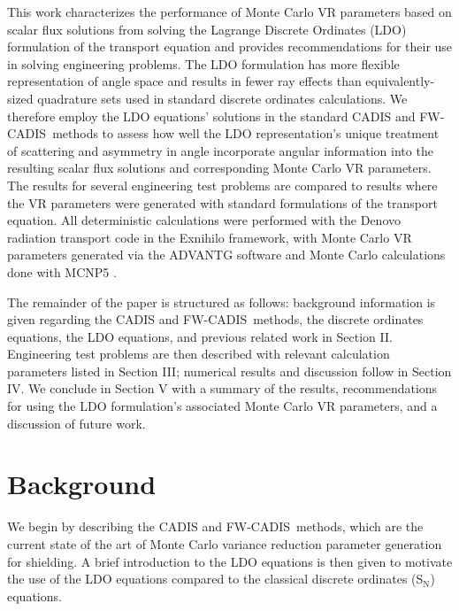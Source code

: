 \documentclass{article} %
\newcommand{\sn}{S$_\mathrm{N}$}
\newcommand{\fwc}{\mbox{FW-CADIS}}
\begin{document}
This work characterizes the performance of Monte Carlo VR parameters based on
scalar flux solutions from solving the Lagrange Discrete Ordinates (LDO)
formulation of the transport equation \cite{ahrens} and provides
recommendations for their use in solving engineering problems. The LDO
formulation has more flexible representation of angle space and results in
fewer ray effects than equivalently-sized quadrature sets used in standard
discrete ordinates calculations. We therefore employ the LDO equations'
solutions in the standard CADIS and \fwc\ methods to assess how well the LDO
representation's unique treatment of scattering and asymmetry in angle
incorporate angular information into the resulting scalar flux solutions and
corresponding Monte Carlo VR parameters. The results for several engineering
test problems are compared to results where the VR parameters were generated
with standard formulations of the transport equation. All deterministic
calculations were performed with the Denovo radiation transport code
\cite{denovo} in the Exnihilo framework, with Monte Carlo VR parameters
generated via the ADVANTG software \cite{advantg} and Monte Carlo calculations
done with MCNP5 \cite{mcnp}.

The remainder of the paper is structured as follows: background information is
given regarding the CADIS and \fwc\ methods, the discrete ordinates equations,
the LDO equations, and previous related work in Section II. Engineering test
problems are then described with relevant calculation parameters listed in
Section III; numerical results and discussion follow in Section IV. We
conclude in Section V with a summary of the results, recommendations for using
the LDO formulation's associated Monte Carlo VR parameters, and a discussion
of future work.

\section{Background}
\label{sec:background}

We begin by describing the CADIS and \fwc\ methods, which are the current
state of the art of Monte Carlo variance reduction parameter generation for
shielding. A brief introduction to the LDO equations is then given to
motivate the use of the LDO equations compared to the classical
discrete ordinates (\sn) equations.

\end{document}
